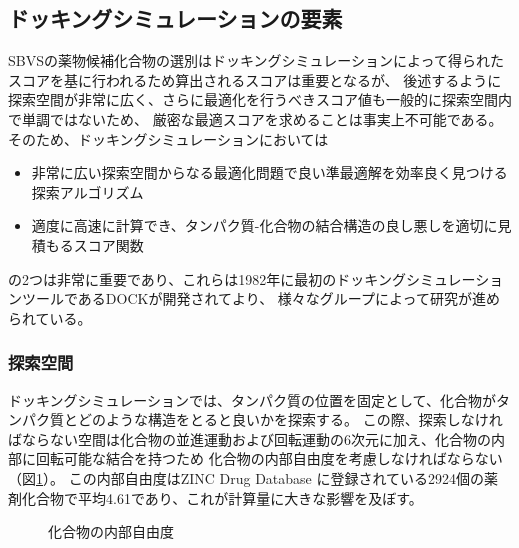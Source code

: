 \subsection{ドッキングシミュレーションの要素}\label{subsec:docking_elements}
SBVSの薬物候補化合物の選別はドッキングシミュレーションによって得られたスコアを基に行われるため算出されるスコアは重要となるが、
後述するように探索空間が非常に広く、さらに最適化を行うべきスコア値も一般的に探索空間内で単調ではないため、
厳密な最適スコアを求めることは事実上不可能である。そのため、ドッキングシミュレーションにおいては
\begin{itemize}
\item 非常に広い探索空間からなる最適化問題で良い準最適解を効率良く見つける探索アルゴリズム
\item 適度に高速に計算でき、タンパク質-化合物の結合構造の良し悪しを適切に見積もるスコア関数
\end{itemize}
の2つは非常に重要であり、これらは1982年に最初のドッキングシミュレーションツールであるDOCK\cite{Kuntz1982}が開発されてより、
様々なグループによって研究が進められている。

\subsubsection{探索空間}
ドッキングシミュレーションでは、タンパク質の位置を固定として、化合物がタンパク質とどのような構造をとると良いかを探索する。
この際、探索しなければならない空間は化合物の並進運動および回転運動の6次元に加え、化合物の内部に回転可能な結合を持つため
化合物の内部自由度を考慮しなければならない（図\ref{fig:docking_freedom}）。
この内部自由度はZINC Drug Database に登録されている2924個の薬剤化合物で平均4.61であり、これが計算量に大きな影響を及ぼす。

\begin{figure}[tb]
 \begin{center}
  \caption{化合物の内部自由度}
  \label{fig:docking_freedom}
 \end{center}
\end{figure}


